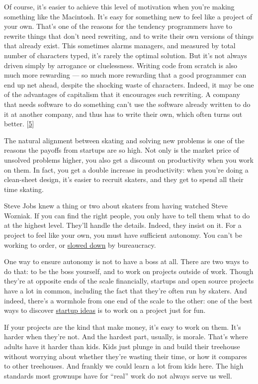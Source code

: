 Of course, it's easier to achieve this level of motivation when you're
making something like the Macintosh. It's easy for something new to feel
like a project of your own. That's one of the reasons for the tendency
programmers have to rewrite things that don't need rewriting, and to
write their own versions of things that already exist. This sometimes
alarms managers, and measured by total number of characters typed, it's
rarely the optimal solution. But it's not always driven simply by
arrogance or cluelessness. Writing code from scratch is also much more
rewarding --- so much more rewarding that a good programmer can end up
net ahead, despite the shocking waste of characters. Indeed, it may be
one of the advantages of capitalism that it encourages such rewriting. A
company that needs software to do something can't use the software
already written to do it at another company, and thus has to write their
own, which often turns out better. {[}\hyperref[f5n]{5}{]}

The natural alignment between skating and solving new problems is one of
the reasons the payoffs from startups are so high. Not only is the
market price of unsolved problems higher, you also get a discount on
productivity when you work on them. In fact, you get a double increase
in productivity: when you're doing a clean-sheet design, it's easier to
recruit skaters, and they get to spend all their time skating.

Steve Jobs knew a thing or two about skaters from having watched Steve
Wozniak. If you can find the right people, you only have to tell them
what to do at the highest level. They'll handle the details. Indeed,
they insist on it. For a project to feel like your own, you must have
sufficient autonomy. You can't be working to order, or
\href{artistsship.html}{slowed down} by bureaucracy.

One way to ensure autonomy is not to have a boss at all. There are two
ways to do that: to be the boss yourself, and to work on projects
outside of work. Though they're at opposite ends of the scale
financially, startups and open source projects have a lot in common,
including the fact that they're often run by skaters. And indeed,
there's a wormhole from one end of the scale to the other: one of the
best ways to discover \href{startupideas.html}{startup ideas} is to work
on a project just for fun.

If your projects are the kind that make money, it's easy to work on
them. It's harder when they're not. And the hardest part, usually, is
morale. That's where adults have it harder than kids. Kids just plunge
in and build their treehouse without worrying about whether they're
wasting their time, or how it compares to other treehouses. And frankly
we could learn a lot from kids here. The high standards most grownups
have for ``real'' work do not always serve us well.

